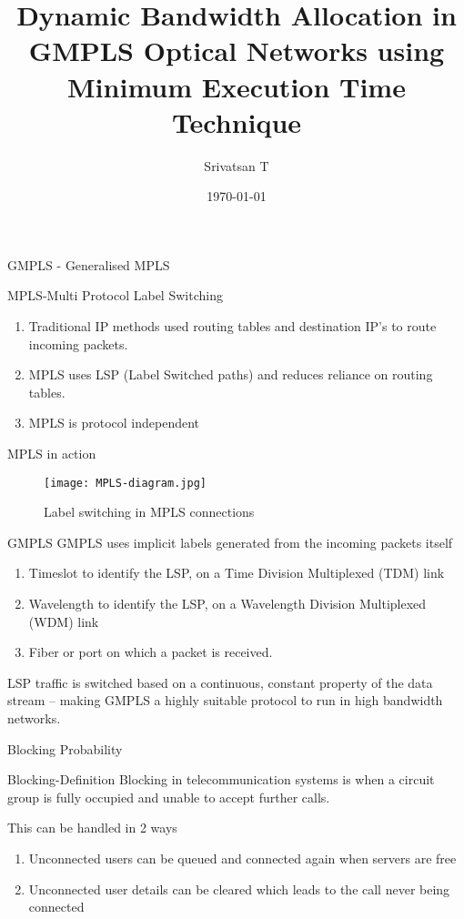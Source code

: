 \documentclass{beamer}
\title{Dynamic Bandwidth Allocation in GMPLS Optical Networks using Minimum Execution Time Technique}
\author{Srivatsan T}
\institute{IITH}
\date{\today}
\begin{document}
\begin{frame}
  \titlepage
\end{frame}
\begin{frame}{GMPLS - Generalised MPLS}
  \begin{block}{MPLS-Multi Protocol Label Switching}
    \begin{enumerate}
      \item Traditional IP methods used routing tables and destination IP's to route incoming packets.
      \item MPLS uses LSP (Label Switched paths) and reduces reliance on routing tables.
      \item MPLS is protocol independent
    \end{enumerate}
  \end{block}
\end{frame}
\begin{frame}{MPLS in action}
  \begin{figure}[!]
    \centering
    \texttt{[image: MPLS-diagram.jpg]}
    \caption{Label switching in MPLS connections}
  \end{figure}
\end{frame}
\begin{frame}{GMPLS}
  GMPLS uses implicit labels generated from the incoming packets itself
  \begin{block}{}
    \begin{enumerate}
      \item Timeslot to identify the LSP, on a Time Division Multiplexed (TDM) link
      \item Wavelength to identify the LSP, on a Wavelength Division Multiplexed (WDM) link
      \item Fiber or port on which a packet is received.
    \end{enumerate}
  \end{block}
  LSP traffic is switched based on a continuous, constant property of the data stream –
  making GMPLS a highly suitable protocol to run in high bandwidth networks.
\end{frame}
\begin{frame}{Blocking Probability}
  \begin{block}{Blocking-Definition}
    Blocking in telecommunication systems is when a circuit group is fully occupied and unable to accept further calls.
  \end{block}
  This can be handled in 2 ways
  \begin{block}{}
    \begin{enumerate}
      \item Unconnected users can be queued and connected again when servers are free
      \item Unconnected user details can be cleared which leads to the call never being connected
    \end{enumerate}
  \end{block}
\end{frame}
\end{document}
